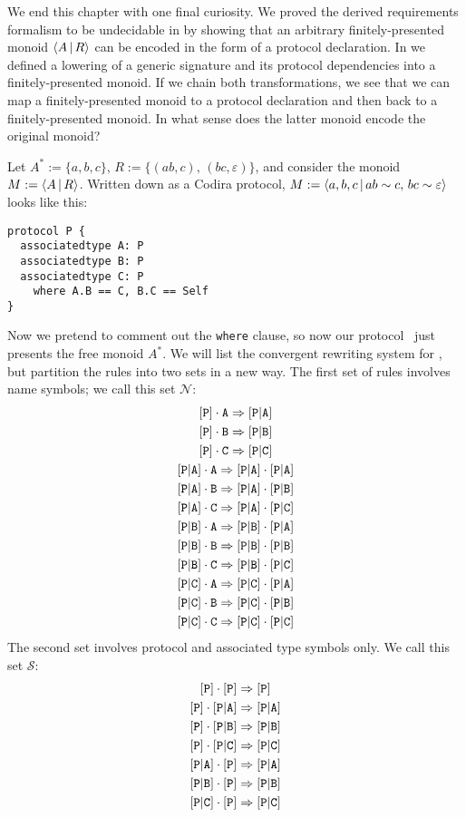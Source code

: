 \documentclass[../generics]{subfiles}
\begin{document}
\begin{example}\label{double encoding}
We end this chapter with one final curiosity. We proved the derived requirements formalism to be undecidable in  by showing that an arbitrary finitely-presented monoid $\langle A\,|\,R\rangle$ can be encoded in the form of a protocol declaration. In  we defined a lowering of a generic signature and its protocol dependencies into a finitely-presented monoid. If we chain both transformations, we see that we can map a finitely-presented monoid to a protocol declaration and then back to a finitely-presented monoid. In what sense does the latter monoid encode the original monoid?

Let $A^*:=\{a,b,c\}$, $R:=\{(ab,c),\,(bc,\varepsilon)\}$, and consider the monoid $M:=\langle A\,|\,R\rangle$. Written down as a Codira protocol, $M := \langle a,b,c\,|\,ab\sim c,\,bc\sim\varepsilon\rangle$ looks like this:
\begin{Verbatim}
protocol P {
  associatedtype A: P
  associatedtype B: P
  associatedtype C: P
    where A.B == C, B.C == Self
}
\end{Verbatim}
Now we pretend to comment out the \texttt{where} clause, so now our protocol \tP\ just presents the free monoid $A^*$. We will list the convergent rewriting system for \tP, but partition the rules into two sets in a new way. The first set of rules involves name symbols; we call this set $\mathcal{N}$:
\begin{gather*}
\AssocIntro{P}{A}\\
\AssocIntro{P}{B}\\
\AssocIntro{P}{C}\\
\aPA\cdot\nA\Rightarrow\aPA\cdot\aPA\\
\aPA\cdot\nB\Rightarrow\aPA\cdot\aPB\\
\aPA\cdot\nC\Rightarrow\aPA\cdot\aPC\\
\aPB\cdot\nA\Rightarrow\aPB\cdot\aPA\\
\aPB\cdot\nB\Rightarrow\aPB\cdot\aPB\\
\aPB\cdot\nC\Rightarrow\aPB\cdot\aPC\\
\aPC\cdot\nA\Rightarrow\aPC\cdot\aPA\\
\aPC\cdot\nB\Rightarrow\aPC\cdot\aPB\\
\aPC\cdot\nC\Rightarrow\aPC\cdot\aPC
\end{gather*}
The second set involves protocol and associated type symbols only. We call this set $\mathcal{S}$:
\begin{gather*}
\ProtoInherit{P}{P}\\
\pP\cdot\aPA\Rightarrow\aPA\\
\pP\cdot\aPB\Rightarrow\aPB\\
\pP\cdot\aPC\Rightarrow\aPC\\
\ProtoConf{\aPA}{P}\\
\ProtoConf{\aPB}{P}\\
\ProtoConf{\aPC}{P}
\end{gather*}


\end{example}
\end{document}
